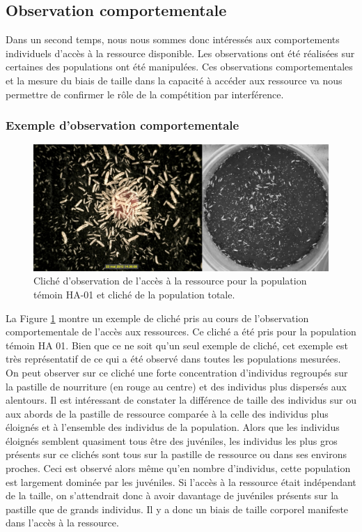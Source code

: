 \subsection{Observation comportementale}

Dans un second temps, nous nous sommes donc intéressés aux comportements
individuels d'accès à la ressource disponible. Les observations ont été
réalisées sur certaines des populations ont été manipulées. Ces observations
comportementales et la mesure du biais de taille dans la capacité à accéder aux
ressource va nous permettre de confirmer le rôle de la compétition par
interférence.

\subsubsection{Exemple d'observation comportementale}

\begin{figure}[!ht]
\begin{center}
\includegraphics[width=1\textwidth]{1_CorpsDeThese/Resumes/Fig/SM05b}
\caption[Cliché
d'observation de l'accès à la ressource]{Cliché
d'observation de l'accès à la ressource pour la population témoin HA-01 et
cliché de la population totale.}
\label{fig:SM5}
\end{center}
\end{figure}

La Figure \ref{fig:SM5} montre un exemple de cliché pris au cours de
l'observation comportementale de l'accès aux ressources. Ce cliché a été pris
pour la population témoin HA 01. Bien que ce ne soit qu'un seul exemple de
cliché, cet exemple est très représentatif de ce qui a été observé dans toutes
les populations mesurées. On peut observer sur ce cliché une forte concentration
d'individus regroupés sur la pastille de nourriture (en rouge au centre) et des
individus plus dispersés aux alentours. Il est intéressant de constater la
différence de taille des individus sur ou aux abords de la pastille de ressource
comparée à la celle des individus plus éloignés et à l'ensemble des individus de
la population. Alors que les individus éloignés semblent quasiment tous être des
juvéniles, les individus les plus gros présents sur ce clichés sont tous sur la
pastille de ressource ou dans ses environs proches.
Ceci est observé alors même qu'en nombre d'individus, cette population est
largement dominée par les juvéniles. Si l'accès à la ressource était indépendant
de la taille, on s'attendrait donc à avoir davantage de juvéniles présents sur
la pastille que de grands individus. Il y a donc un biais de taille corporel
manifeste dans l'accès à la ressource.


